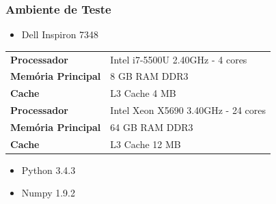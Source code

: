 \documentclass[10pt]{beamer}
\begin{document}
\begin{frame}[fragile]
  \frametitle{Ambiente de Teste}

 \begin{itemize}
      \item Dell Inspiron 7348
    \end{itemize}

    \begin{table}[!htb]
    \footnotesize
    \centering
    \begin{tabular}{ll}
      \toprule
      \textbf{Processador} & Intel i7-5500U 2.40GHz - 4 cores  \\
      \textbf{Memória Principal} & 8 GB RAM DDR3 \\
      \textbf{Cache} & L3 Cache 4 MB \\
      \midrule
      \textbf{Processador} & Intel Xeon X5690 3.40GHz - 24 cores  \\
      \textbf{Memória Principal} & 64 GB RAM DDR3 \\
      \textbf{Cache} & L3 Cache 12 MB \\
      \bottomrule
    \end{tabular}
    \end{table}

  \begin{itemize}
    \item Python 3.4.3
    \item Numpy 1.9.2
  \end{itemize}
  
\end{frame}
\end{document}
